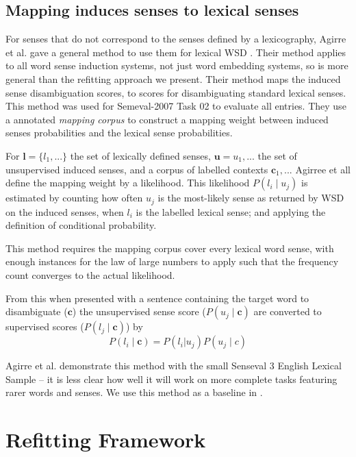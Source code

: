 \documentclass{sig-alternate}
\renewcommand{\c}{\mathbf{c}}
\renewcommand{\l}{\mathbf{l}}
\renewcommand{\u}{\mathbf{u}}
\begin{document}
\subsection{Mapping induces senses to lexical senses}
For senses that do not correspond to the senses defined by a lexicography,  Agirre et al. gave a general method to use them for lexical WSD \parencite{agirre2006}. 
Their method applies to all word sense induction systems, not just word embedding systems, so is more general than the refitting approach we present.
Their method maps the induced sense disambiguation scores, to scores for disambiguating standard lexical senses. This method was used for Semeval-2007 Task 02 \parencite{SemEval2007WSIandWSD} to evaluate all entries.
They use a annotated \emph{mapping corpus} to construct a mapping weight between induced senses probabilities and the lexical sense probabilities.

For $\l=\{l_1,...\}$ the set of lexically defined senses, $\u={u_1,...}$ the set of unsupervised induced senses, and a corpus of labelled contexts ${\c_1, ...}$ Agirree et all define the mapping weight by a likelihood.
This likelihood $P(l_i \mid u_j)$ is estimated by counting how often $u_j$ is the most-likely sense as returned by WSD on the induced senses, when $l_i$ is the labelled lexical sense; and applying the definition of conditional probability.

This method requires the mapping corpus cover every lexical word sense, with enough instances for the law of large numbers to apply such that the frequency count converges to the actual likelihood.  

From this  when presented with a sentence containing the target word to disambiguate ($\c$) the unsupervised sense score ($P(u_j \mid \c)$ are converted to supervised scores ($P(l_j \mid \c)$) by
\begin{equation} \label{eq:agireewsd}
P(l_i \mid \c) = P(l_i | u_j) P(u_j \mid c)
\end{equation}


Agirre et al. demonstrate this method with the small Senseval 3 English Lexical Sample \parencite{mihalcea2004senseval} -- it is less clear how well it will work on more complete tasks featuring rarer words and senses. We use this method as a baseline in .


\section{Refitting Framework} \label{refitting} \label{Framework}
\end{document}
